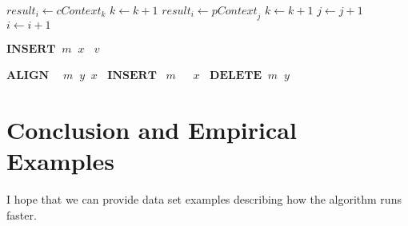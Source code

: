 \documentclass[11pt]{article}
\begin{document}
\begin{algorithm}
\begin{algorithmic}[1]
                  \State $\textit{result}_i \gets \textit{cContext}_k$
                  \State $\textit{k} \gets \textit{k} + 1$
                \EndCase
                  \State $\textit{result}_i \gets \textit{pContext}_j$
                  \State $\textit{k} \gets \textit{k} + 1$
                \EndCase
              \EndSwitch
              \State $\textit{j} \gets \textit{j} + 1$
            \EndCase
          \EndSwitch
        \EndIf  
        \State $\textit{i} \gets \textit{i} + 1$
      \EndFor
    \EndFunction
      
      \EndFor
    \EndFunction
      
          \Return $\textbf{INSERT} \;\; \textit{m} \;\; \textit{x} \;\;$
        \EndCase
          \Return $\textit{v}$
        \EndCase
      \EndSwitch
    \EndFunction

          \Return $\textbf{ALIGN} \quad\; \textit{m} \;\;      \textit{y} \;\; \textit{x} \;\;$
        \EndCase
          \Return $\textbf{INSERT} \;\;\; \textit{m} \;\;\quad \textit{x} \;\;$
        \EndCase
          \Return $\textbf{DELETE} \;\;   \textit{m} \;\;      \textit{y} \;\;$
        \EndCase
      \EndSwitch
    \EndFunction

  \end{algorithmic}
\end{algorithm}


\section{Conclusion and Empirical Examples}
I hope that we can provide data set examples describing how the algorithm runs faster.
\end{document}

